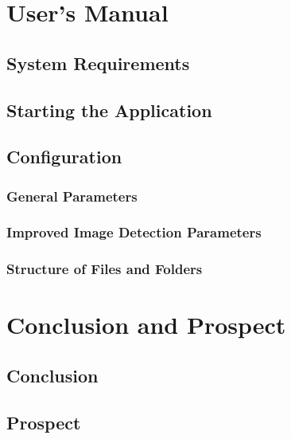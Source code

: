 \documentclass[a4paper, 11pt]{article}
\begin{document}
\newpage
\section{User's Manual}

\subsection{System Requirements}

\subsection{Starting the Application}

\subsection{Configuration}
\subsubsection{General Parameters}
\subsubsection{Improved Image Detection Parameters}
\subsubsection{Structure of Files and Folders}

\newpage
\section{Conclusion and Prospect}
 
\subsection{Conclusion}

\subsection{Prospect}


\newpage
{}

\end{document}
